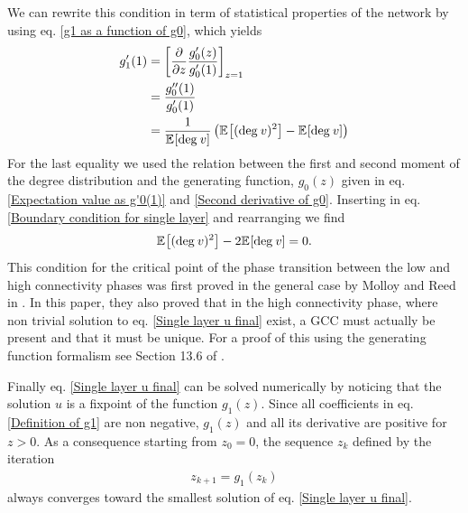 \documentclass[
11pt, %
english, %
singlespacing, %
nolistspacing, %
liststotoc, %
headsepline, %
]{MastersDoctoralThesis} %
\begin{document}
We can rewrite this condition in term of statistical properties of the network by using eq. \eqref{g1 as a function of g0}, which yields
\begin{align}
	g'_1(1) &= \left[ \frac{\partial}{\partial z} \frac{g'_0(z)}{g'_0(1)} \right]_{z = 1} \\
		&= \frac{g''_0(1)}{g'_0(1)} \\
		&= \frac{1}{\mathbb{E}_{}\!\left[ \mathrm{deg}_{}\, v \right]} \left( \mathbb{E}_{}\!\left[ (\mathrm{deg}_{}\, v)^2 \right] - \mathbb{E}_{}\!\left[ \mathrm{deg}_{}\, v \right] \right)
\end{align}
For the last equality we used the relation between the first and second moment of the degree distribution and the generating function, $g_0(z)$ given in eq. \eqref{Expectation value as g'0(1)} and \eqref{Second derivative of g0}. Inserting in eq. \eqref{Boundary condition for single layer} and rearranging we find
\begin{align}
	\mathbb{E}_{}\!\left[ (\mathrm{deg}_{}\, v)^2 \right] - 2 \mathbb{E}_{}\!\left[ \mathrm{deg}_{}\, v \right] = 0.
\end{align}
This condition for the critical point of the phase transition between the low and high connectivity phases was first proved in the general case by Molloy and Reed in \cite{molloy1995critical}. In this paper, they also proved that in the high connectivity phase, where non trivial solution to eq. \eqref{Single layer u final} exist, a GCC must actually be present and that it must be unique. For a proof of this using the generating function formalism see Section 13.6 of \cite{newman2010networks}.

Finally eq. \eqref{Single layer u final} can be solved numerically by noticing that the solution $u$ is a fixpoint of the function $g_1(z)$. Since all coefficients in eq. \eqref{Definition of g1} are non negative, $g_1(z)$ and all its derivative are positive for $z > 0$. As a consequence starting from $z_0 = 0$, the sequence $z_k$ defined by the iteration
\begin{align}
	z_{k + 1}  = g_1(z_k)  \label{Single layer fixpoint g1 iteration}
\end{align}
always converges toward the smallest solution of eq. \eqref{Single layer u final}.
\end{document}

